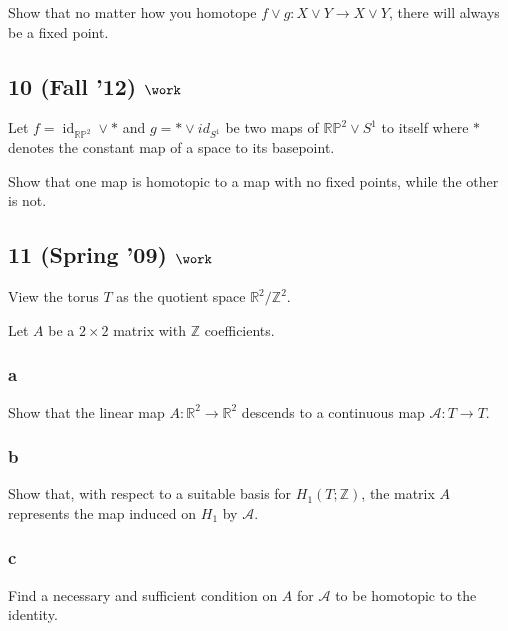 Show that no matter how you homotope
\(f \lor g : X \lor Y \to X \lor Y\), there will always be a fixed
point.

\hypertarget{fall-12-work-3}{%
\subsection{\texorpdfstring{10 (Fall '12)
\(\work\)}{10 (Fall '12) \textbackslash work}}\label{fall-12-work-3}}

Let \(f = \operatorname{id}_{{\mathbb{RP}}^2} \lor \ast\) and
\(g = \ast \lor id_{S^1}\) be two maps of \({\mathbb{RP}}^2 \lor S^1\)
to itself where \(\ast\) denotes the constant map of a space to its
basepoint.

Show that one map is homotopic to a map with no fixed points, while the
other is not.

\hypertarget{spring-09-work-7}{%
\subsection{\texorpdfstring{11 (Spring '09)
\(\work\)}{11 (Spring '09) \textbackslash work}}\label{spring-09-work-7}}

View the torus \(T\) as the quotient space
\({\mathbb{R}}^2 /{\mathbb{Z}}^2\).

Let \(A\) be a \(2 \times 2\) matrix with \({\mathbb{Z}}\) coefficients.

\hypertarget{a-6}{%
\subsubsection{a}\label{a-6}}

Show that the linear map \(A : {\mathbb{R}}^2 \to {\mathbb{R}}^2\)
descends to a continuous map \({\mathcal{A}}: T \to T\).

\hypertarget{b-6}{%
\subsubsection{b}\label{b-6}}

Show that, with respect to a suitable basis for
\(H_1 (T ; {\mathbb{Z}})\), the matrix \(A\) represents the map induced
on \(H_1\) by \({\mathcal{A}}\).

\hypertarget{c-2}{%
\subsubsection{c}\label{c-2}}

Find a necessary and sufficient condition on \(A\) for \({\mathcal{A}}\)
to be homotopic to the identity.

